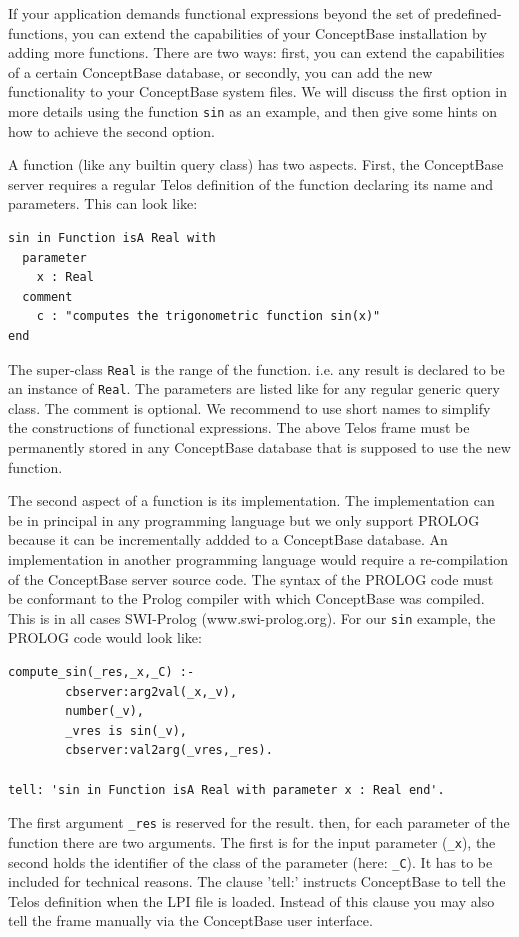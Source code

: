 If your application demands functional expressions beyond the set of predefined-functions,
you can extend the capabilities of your ConceptBase installation by adding more
functions. There are two ways: first, you can extend the capabilities of a certain
ConceptBase database,
or secondly, you can add the new functionality to your ConceptBase system files.
We will discuss the first option in more details using the function {\tt sin} as
an example, and then give some hints on how to achieve the
second option.

A function (like any builtin query class) has two aspects. First, the ConceptBase server requires
a regular Telos definition of the function declaring its name and parameters. This can look like:

{\small
\begin{verbatim}
sin in Function isA Real with
  parameter
    x : Real
  comment
    c : "computes the trigonometric function sin(x)" 
end
\end{verbatim}
}

The super-class {\tt Real} is the range of the function. i.e. any result is declared to be
an instance of {\tt Real}. The parameters are listed like for any regular generic query
class. The comment is optional.
We recommend to use short names to simplify the constructions of functional expressions.
The above Telos frame must be permanently stored in any ConceptBase database that is supposed to
use the new function.

The second aspect of a function is its implementation. The implementation can be in principal
in any programming language but we only support PROLOG because it can be incrementally addded
to a ConceptBase database. An implementation in another programming language would
require a re-compilation of the ConceptBase server source code. The syntax of the PROLOG code
must be conformant to the Prolog compiler with which ConceptBase was compiled. This is
in all cases SWI-Prolog (www.swi-prolog.org). For our {\tt sin} example, the PROLOG code would look like:

{\small
\begin{verbatim}
compute_sin(_res,_x,_C) :-
        cbserver:arg2val(_x,_v),
        number(_v),
        _vres is sin(_v),
        cbserver:val2arg(_vres,_res).

tell: 'sin in Function isA Real with parameter x : Real end'.
\end{verbatim}
}

The first argument {\tt \_res} is reserved for the result. then, for each parameter of the function
there are two arguments. The first is for the input parameter ({\tt \_x}), the second holds the
identifier of the class of the parameter (here: {\tt \_C}). It has to be included for technical
reasons. The clause 'tell:' instructs ConceptBase to tell the Telos definition when the
LPI file is loaded. Instead of this clause you may also tell the frame manually via the ConceptBase
user interface.

